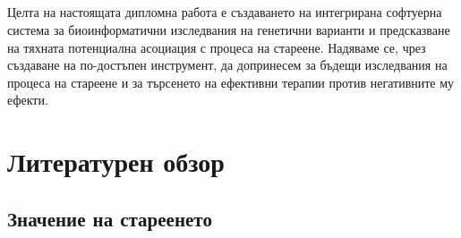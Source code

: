 \documentclass[pdftex,cyrillic,14pt,a4page,book]{extreport}
\begin{document}
\paragraph{}
Целта на настоящата дипломна работа е създаването на интегрирана софтуерна система за биоинформатични изследвания на генетични варианти и предсказване на тяхната потенциална асоциация с процеса на стареене. Надяваме се, чрез създаване на по-достъпен инструмент, да допринесем за бъдещи изследвания на процеса на стареене и за търсенето на ефективни терапии против негативните му ефекти.
            
\chapter{Литературен обзор}
\section{Значение на стареенето}
\end{document}

